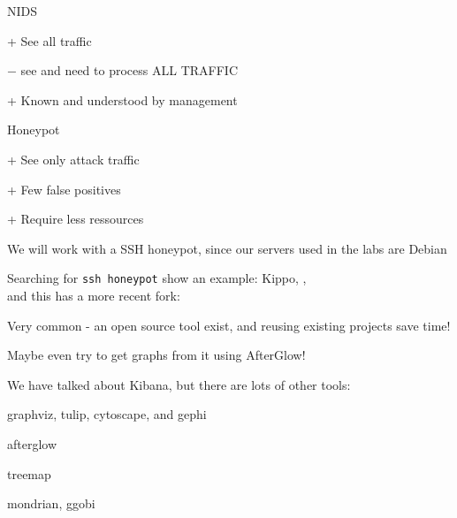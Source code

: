 \documentclass[Screen16to9,17pt]{foils}
\begin{document}

\begin{list1}
\item NIDS
\begin{list2}
\item + See all traffic
\item $-$ see and need to process ALL TRAFFIC
\item + Known and understood by management
\end{list2}
\item Honeypot
\begin{list2}
\item + See only attack traffic
\item + Few false positives
\item + Require less ressources
\end{list2}
\end{list1}


We will work with a SSH honeypot, since our servers used in the labs are Debian

Searching for \verb+ssh honeypot+  show an example: Kippo,
,\\
and this has a more recent fork: 

Very common - an open source tool exist, and reusing existing projects save time!

Maybe even try to get graphs from it using AfterGlow!\\




We have talked about Kibana, but there are lots of other tools:

\begin{list2}
\item graphviz, tulip, cytoscape, and gephi
\item afterglow \\
\item treemap
\item mondrian, ggobi
\end{list2}
\end{document}
